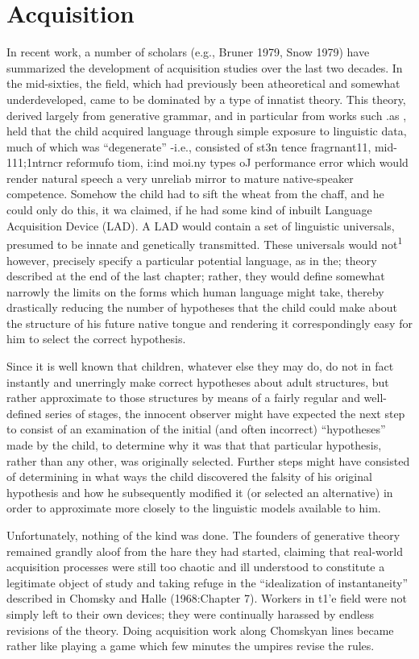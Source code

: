 \chapter{Acquisition}

In recent work, a number of scholars (e.g., Bruner 1979, Snow 1979) have summarized the development of acquisition studies over the last two decades. In the mid-sixties, the field, which had previously been atheoretical and somewhat underdeveloped, came to be domi\-nated by a type of innatist theory. This theory, derived largely from generative grammar, and in particular from works such .as \citet{Chomsky1962}, held that the child acquired language through simple exposure to linguistic data, much of which was ``degenerate'' {}-i.e., consisted of st3n tence fragrnant11, mid-111;1ntrncr reformufo tiom, i:ind moi.ny types oJ performance error which would render natural speech a very unreliab mirror to mature native-speaker competence. Somehow the child had to sift the wheat from the chaff, and he could only do this, it wa claimed, if he had some kind of inbuilt Language Acquisition Device (LAD). A LAD would contain a set of linguistic universals, presumed to be innate and genetically transmitted. These universals would not\textsuperscript{1} however, precisely specify a particular potential language, as in the; theory described at the end of the last chapter; rather, they would de\-fine somewhat narrowly the limits on the forms which human language might take, thereby drastically reducing the number of hypotheses
that the child could make about the structure of his future native tongue and rendering it correspondingly easy for him to select the correct hypothesis.

Since it is well known that children, whatever else they may do, do not in fact instantly and unerringly make correct hypotheses about adult structures, but rather approximate to those structures by means of a fairly regular and well-defined series of stages, the innocent ob\-server might have expected the next step to consist of an examination of the initial (and often incorrect) ``hypotheses'' made by the child, to determine why it was that that particular hypothesis, rather than any other, was originally selected. Further steps might have con\-sisted of determining in what ways the child discovered the falsity of his original hypothesis and how he subsequently modified it (or selected an alternative) in order to approximate more closely to the linguistic models available to him.

Unfortunately, nothing of the kind was done. The founders of generative theory remained grandly aloof from the hare they had started, claiming that real-world acquisition processes were still too chaotic and ill understood to constitute a legitimate object of study and taking refuge in the ``idealization of instantaneity'' described in Chomsky and Halle (1968:Chapter 7). Workers in t1'e field were not simply left to their own devices; they were continually harassed by endless revisions of the theory. Doing acquisition work along Chom\-skyan lines became rather like playing a game which few minutes the umpires revise the rules.


